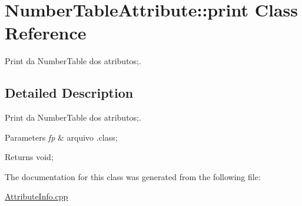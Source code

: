 \hypertarget{class_number_table_attribute_1_1print}{}\section{Number\+Table\+Attribute\+:\+:print Class Reference}
\label{class_number_table_attribute_1_1print}


Print da Number\+Table dos atributos;.  




\subsection{Detailed Description}
Print da Number\+Table dos atributos;. 


\begin{DoxyParams}{Parameters}
{\em fp} & arquivo .class; \\
\hline
\end{DoxyParams}
\begin{DoxyReturn}{Returns}
void; 
\end{DoxyReturn}


The documentation for this class was generated from the following file\+:\begin{DoxyCompactItemize}
\item 
\hyperlink{_attribute_info_8cpp}{Attribute\+Info.\+cpp}\end{DoxyCompactItemize}
